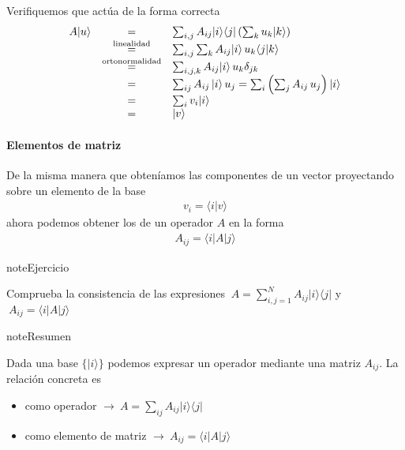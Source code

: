 \documentclass[letterpaper,10pt,english]{jupyterBook}
\newcommand{\bra}[1]{\langle #1|}
\newcommand{\ket}[1]{|#1\rangle}
\newcommand{\braket}[2]{\langle #1|#2\rangle}
\newcommand{\ketbra}[2]{| #1\rangle \langle #2 |}
\begin{document}
\sphinxAtStartPar
Verifiquemos que actúa de la forma correcta
\begin{equation*}
\begin{split}
\begin{array}{rcl}
A |u\rangle &=&  \sum_{i,j} A_{ij} \ketbra{i}{j}  \left(\sum_k u_k |k\rangle \right) \\
&\stackrel{\rm linealidad}{=} \rule{0mm}{6mm}& \sum_{i,j} \sum_k A_{ij} | i\rangle  \,   u_k \langle j| k\rangle \nonumber\\
&\stackrel{\rm ortonormalidad}{=}\rule{0mm}{6mm}& \sum_{i,j,k} A_{ij} | i\rangle  \,   u_k \delta_{jk}\\
&=\rule{0mm}{6mm}&\sum_{ij} A_{ij}\,|i\rangle \, u_j= \sum_i \left(\sum_{j} A_{ij}\, u_j\right)  |i\rangle    \\
&=\rule{0mm}{6mm}&\sum_i v_i \ket{i} \nonumber\\
&=\rule{0mm}{6mm}&   | v\rangle
\end{array}
\end{split}
\end{equation*}

\paragraph{Elementos de matriz}
\label{\detokenize{docs/Part_01_Formalismo/Chapter_01_02_Formalismo_matem_xe1tico/01_03_Operadores_myst:elementos-de-matriz}}
\sphinxAtStartPar
De la misma manera que obteníamos las componentes de un vector proyectando sobre un elemento de la base
\begin{equation*}
\begin{split}
v_i = \braket{i}{v}
\end{split}
\end{equation*}
\sphinxAtStartPar
ahora podemos obtener los  de un operador \(A\) en la forma
\begin{equation*}
\begin{split}  A_{ij} = \bra{i} A \ket{j} \end{split}
\end{equation*}
\begin{sphinxadmonition}{note}{Ejercicio}

\sphinxAtStartPar
Comprueba la consistencia de las expresiones \(~A = \sum_{i,j=1}^N A_{ij} \ketbra{i}{j} \) y \(~A_{ij} = \bra{i} A \ket{j}\)
\end{sphinxadmonition}

\begin{sphinxadmonition}{note}{Resumen}

\sphinxAtStartPar
Dada una base \(\{\ket{i}\}\) podemos expresar un operador mediante una matriz \(A_{ij}\). La relación concreta es
\begin{itemize}
\item {} 
\sphinxAtStartPar
como operador \(\to ~ A = \sum_{ij} A_{ij}\ketbra{i}{j}\)

\item {} 
\sphinxAtStartPar
como elemento de matriz \(\to ~ A_{ij} = \bra{i}A\ket{j}\)

\end{itemize}
\end{sphinxadmonition}
\end{document}
